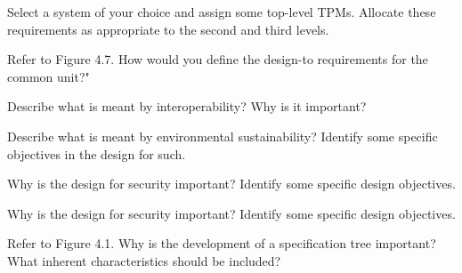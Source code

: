 \begin{exercises}
    \begin{exercise}
    \label{sea-4-6}
        Select a system of your choice and assign some top-level TPMs. Allocate these requirements as appropriate to the second and third levels.
    \end{exercise}
    \begin{solution}
    \end{solution}
    
    \begin{exercise}
    \label{sea-4-7}
        Refer to Figure 4.7. How would you define the design-to requirements for the common unit?"
    \end{exercise}
    \begin{solution}
    \end{solution}
    
    \begin{exercise}
    \label{sea-4-8}
        Describe what is meant by interoperability? Why is it important?
    \end{exercise}
    \begin{solution}
    \end{solution}
    
    \begin{exercise}
    \label{sea-4-9}
        Describe what is meant by environmental sustainability? Identify some specific objectives in the design for such. 
    \end{exercise}
    \begin{solution}
    \end{solution}
    
    \begin{exercise}
    \label{sea-4-10}
        Why is the design for security important? Identify some specific design objectives. 
    \end{exercise}
    \begin{solution}
    \end{solution}
    
    \begin{exercise}
    \label{sea-4-11}
        Why is the design for security important? Identify some specific design objectives. 
    \end{exercise}
    \begin{solution}
    \end{solution}
    
    \begin{exercise}
    \label{sea-4-12}
        Refer to Figure 4.1. Why is the development of a specification tree important? What inherent characteristics should be included?
    \end{exercise}
    \begin{solution}
    \end{solution}
    

\end{exercises}
